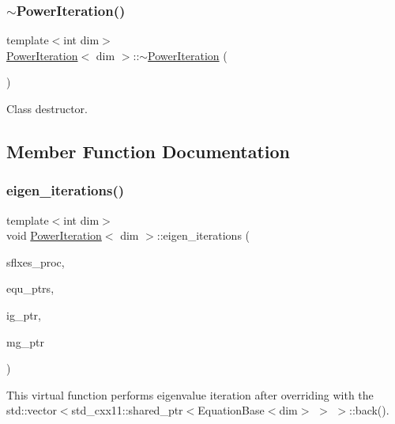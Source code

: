 \subsubsection{\texorpdfstring{$\sim$\+Power\+Iteration()}{~PowerIteration()}}
{\footnotesize\ttfamily template$<$int dim$>$ \\
\hyperlink{class_power_iteration}{Power\+Iteration}$<$ dim $>$\+::$\sim$\hyperlink{class_power_iteration}{Power\+Iteration} (\begin{DoxyParamCaption}{ }\end{DoxyParamCaption})}



Class destructor. 



\subsection{Member Function Documentation}
\mbox{\label{class_power_iteration_a583586002126f8b7a523e95327047cba}} 
\subsubsection{\texorpdfstring{eigen\+\_\+iterations()}{eigen\_iterations()}}
{\footnotesize\ttfamily template$<$int dim$>$ \\
void \hyperlink{class_power_iteration}{Power\+Iteration}$<$ dim $>$\+::eigen\+\_\+iterations (\begin{DoxyParamCaption}\item[{std\+::vector$<$ Vector$<$ double $>$ $>$ \&}]{sflxes\+\_\+proc,  }\item[{std\+::vector$<$ std\+\_\+cxx11\+::shared\+\_\+ptr$<$ \hyperlink{class_equation_base}{Equation\+Base}$<$ dim $>$ $>$ $>$ \&}]{equ\+\_\+ptrs,  }\item[{std\+\_\+cxx11\+::shared\+\_\+ptr$<$ \hyperlink{class_i_g_base}{I\+G\+Base}$<$ dim $>$ $>$}]{ig\+\_\+ptr,  }\item[{std\+\_\+cxx11\+::shared\+\_\+ptr$<$ \hyperlink{class_m_g_base}{M\+G\+Base}$<$ dim $>$ $>$}]{mg\+\_\+ptr }\end{DoxyParamCaption})\hspace{0.3cm}{\ttfamily [virtual]}}

This virtual function performs eigenvalue iteration after overriding with the std\+::vector$<$std\+\_\+cxx11\+::shared\+\_\+ptr$<$Equation\+Base$<$dim$>$ $>$ $>$\+::back().

